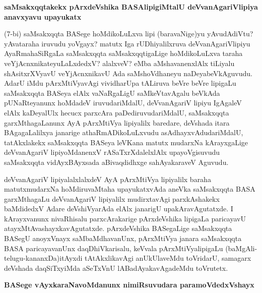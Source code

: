 \newpage

{\bigskip
\noindent
{\large\bf saMsakxqqtakekx pArxdeVshika BASAlipigiMtalU deVvanAgariVlipiya anavxyavu upayukatx}}\label{page33f}
\medskip

\noindent
(7-bi) saMsakxqqta BASege hoMdikoLuLxva lipi (baravaNige)yu yAvu\-dAdiVtu? yAvataraha iru\-vudu yoVgayx? matutx Iga rUDhiyalilxruva deVvanAgariVlipiyu AyaRmahaSiRgaLa saMsakxqqta saMsakxqqti\-gaLige hoMdikoLuLxva taraha veYjAcnxnikateyuLaLxdedxV? alalxveV? eMba aMshavanenxlAlx tiLiyalu shAsitxrXV\-yavU veYjAcnxnikavU Ada saMshoVdhaneyu naDeyabeVkAguvudu. AdarU iMdu pArxMtiVya\-vAgi vividharUpa tALiruva beVre beVre lipigaLu saMsakxqqta BASeya elAlx vaNaRgaLigU saMkeVtavAgalu beVkAda pUNaRteyanunx hoMdadeV iruvudariMdalU, deVvanAgariV lipiyu IgAgaleV elAlx kaDe\-yalUlx hecucx parxcAra paDediruvudariMdalU, saMsakxqqta garxMthagaLanunx AyA pArxMtiVya lipiyalilx bare\-dare, deV\-shada itara BAgagaLalilxya janarige athaRmADikoLuLxvudu asAdhayxvAdudariMdalU, tatAkxlakekx saMsakxqqta
BASeya leVKana matutx mudarxNa kArayxgaLige deVvanAgariV lipiyoMdanenxV rASaTxrXdalelxlAlx upa\-yoVgisu\-vudu saMsakxqqta vidAyxBAyxsada aBivaqdidhxge sahAyakaraveV Aguvudu. 

deVvanAgariV lipiyalalxlalxdeV AyA pArxMtiVya lipiyalilx baraha matutx\break \hbox{mudarxNa} hoMdiru\-vaMtaha upayukatxvAda aneVka saMsakxqqta BASA garxMthagaLu deVva\-nAgariV lipiyalilx mudirxtavAgi parxkAshakekx baMdi\-dedxV Adare deVshiVyarAda elAlx janarigU upakAravAgutatxde. I kArayxvanunx nivaRhisalu parxcAraka\-rige pArxdeV\-shika lipigaLa paricayavU atayxMtAvashayxkavAgutatxde. pArxdeVshika BASegaLige saMsakxqqta BASegU anoyxVnayx saMbaMdhavanUnx, pArxMtiVya janara saMsakxqqta BASA paricaya\-vanUnx daqDhiVkarisalu, keVvala pArxMtiVya\-lipigaLu (baMgAli-telugu-kananxDa)\break itAyxdi tAtAkxlikavAgi anUkUlaveMdu toVridarU, sama\-garx \-deVshada daqSiTxyiMda aSeTxVnU lABadAyakavAgadeMdu toVrutetx.

{\bigskip
\noindent
{\large\bf BASege vAyxkaraNavoMdanunx nimiRsuvudara paramoVdedxVshayx}}\label{page34}
\medskip


